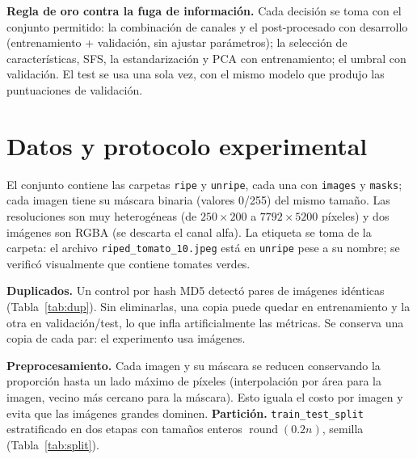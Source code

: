 \documentclass[11pt,a4paper]{article}
\newcommand{\tabin}[1]{\adjustbox{max width=\linewidth}{}}
\begin{document}
\textbf{Regla de oro contra la fuga de información.} Cada decisión se toma con el conjunto
permitido: la combinación de canales y el post-procesado con desarrollo (entrenamiento +
validación, sin ajustar parámetros); la selección de características, SFS, la
estandarización y PCA con entrenamiento; el umbral con validación. El test se usa una sola
vez, con el mismo modelo que produjo las puntuaciones de validación.

\section{Datos y protocolo experimental}

El conjunto contiene las carpetas \texttt{ripe} y \texttt{unripe}, cada una con
\texttt{images} y \texttt{masks}; cada imagen tiene su máscara binaria (valores 0/255) del
mismo tamaño. Las resoluciones son muy heterogéneas (de $250\times200$ a
$7792\times5200$ píxeles) y dos imágenes son RGBA (se descarta el canal alfa). La etiqueta
se toma de la carpeta: el archivo \texttt{riped\_tomato\_10.jpeg} está en \texttt{unripe}
pese a su nombre; se verificó visualmente que contiene tomates verdes.

\textbf{Duplicados.} Un control por hash MD5 detectó \NDuplicates{} pares de imágenes
idénticas (Tabla~\ref{tab:dup}). Sin eliminarlas, una copia puede quedar en entrenamiento y
la otra en validación/test, lo que infla artificialmente las métricas. Se conserva una copia
de cada par: el experimento usa \NImages{} imágenes.

\begin{table}[H]
\centering
\begin{minipage}{0.47\textwidth}\centering
\caption{Duplicados eliminados.}\label{tab:dup}
\tabin{results/tex/duplicates.tex}
\end{minipage}\hfill
\begin{minipage}{0.5\textwidth}\centering
\caption{Partición estratificada por imagen.}\label{tab:split}
\tabin{results/tex/split.tex}
\end{minipage}
\end{table}

\textbf{Preprocesamiento.} Cada imagen y su máscara se reducen conservando la proporción
hasta un lado máximo de \MaxSide{} píxeles (interpolación por área para la imagen, vecino más
cercano para la máscara). Esto iguala el costo por imagen y evita que las imágenes grandes
dominen. \textbf{Partición.} \texttt{train\_test\_split} estratificado en dos etapas con
tamaños enteros $\operatorname{round}(0.2n)$, semilla \Seed{} (Tabla~\ref{tab:split}).
\end{document}
